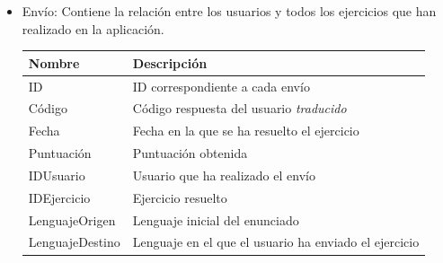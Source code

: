 \begin{itemize}
\item Envío: Contiene la relación entre los usuarios y todos los ejercicios que han realizado en la aplicación.

\begin{tabularx}{15cm}{|l|X|}
\hline
\textbf{Nombre} & \textbf{Descripción}                                                              \\ \hline
ID       & ID correspondiente a cada envío \\ \hline
Código     & Código respuesta del usuario \emph{traducido}                                           \\ \hline
Fecha     & Fecha en la que se ha resuelto el ejercicio                                           \\ \hline
Puntuación     & Puntuación obtenida                                           \\ \hline
IDUsuario     & Usuario que ha realizado el envío                                           \\ \hline
IDEjercicio     & Ejercicio resuelto                                           \\ \hline
LenguajeOrigen     & Lenguaje inicial del enunciado                                           \\ \hline
LenguajeDestino     & Lenguaje en el que el usuario ha enviado el ejercicio                                           \\ \hline
\end{tabularx}

\end{itemize}